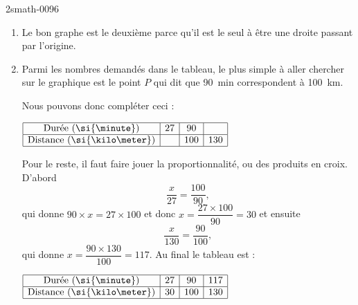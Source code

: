 
\begin{corrige}{2smath-0096}

    \begin{enumerate}
        \item
            Le bon graphe est le deuxième parce qu'il est le seul à être une droite passant par l'origine.
        \item
            Parmi les nombres demandés dans le tableau, le plus simple à aller chercher sur le graphique est le point \( P\) qui dit que \SI{90}{\minute} correspondent à \SI{100}{\kilo\meter}.
            \begin{center}
   
            \end{center}
            Nous pouvons donc compléter ceci :
\begin{center}
$
    \begin{array}[]{|c|c|c|c|}
          \hline
          \text{Durée (\si{\minute})}&27&90&\\
        \hline
        \text{Distance (\si{\kilo\meter})}&&100&130\\
          \hline
    \end{array}
    $
\end{center}

Pour le reste, il faut faire jouer la proportionnalité, ou des produits en croix. D'abord
\begin{equation}
    \frac{ x }{ 27 }=\frac{ 100 }{ 90 },
\end{equation}
qui donne \( 90\times x=27\times 100\) et donc \( x=\dfrac{ 27\times 100 }{ 90 }=30\) et ensuite
\begin{equation}
    \frac{ x }{ 130 }=\frac{ 90 }{ 100 },
\end{equation}
qui donne \( x=\dfrac{ 90\times 130 }{ 100 }=117\). Au final le tableau est :
\begin{center}
$
    \begin{array}[]{|c|c|c|c|}
          \hline
          \text{Durée (\si{\minute})}&27&90&117\\
        \hline
        \text{Distance (\si{\kilo\meter})}&30&100&130\\
          \hline
    \end{array}
    $
\end{center}
    \end{enumerate}

\end{corrige}
